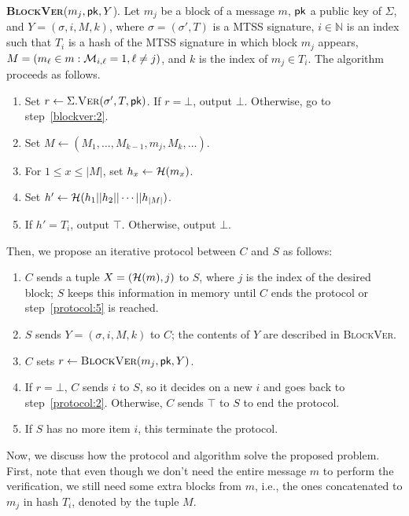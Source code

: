 \documentclass[12pt]{article}
\begin{document}
\noindent\textbf{\textsc{BlockVer}}($m_j, \mathsf{pk}, Y$). Let $m_j$ be a block of a message $m$, $\mathsf{pk}$ a public key of $\Sigma$, and $Y = (\sigma, i, M, k)$, where $\sigma = (\sigma', T)$ is a MTSS signature, $i \in \mathbb{N}$ is an index such that $T_i$ is a hash of the MTSS signature in which block $m_j$ appears, $M = (m_{\ell} \in m : \mathcal{M}_{i, \ell} = 1, \ell \neq j)$, and $k$ is the index of $m_{j} \in T_{i}$. The algorithm proceeds as follows.

\begin{enumerate}
  \item\label{blockver:1} Set $r \leftarrow \Sigma.\textsc{Ver}(\sigma', T, \mathsf{pk})$. If $r = \bot$, output $\bot$. Otherwise, go to step~\ref{blockver:2}.
  \item\label{blockver:2} Set $M \leftarrow (M_{1}, \dots, M_{k - 1}, m_{j}, M_{k}, \dots)$.
  \item\label{blockver:3} For $1 \leq x \leq |M|$, set $h_{x} \leftarrow \mathcal{H}(m_{x})$.
  \item\label{blockver:4} Set $h' \leftarrow \mathcal{H}(h_{1} || h_{2} || \cdots || h_{|M|})$.
  \item\label{blockver:5} If $h' = T_{i}$, output $\top$. Otherwise, output $\bot$.
\end{enumerate}

\noindent Then, we propose an iterative protocol between $C$ and $S$ as follows:
\begin{enumerate}
  \item\label{protocol:1} $C$ sends a tuple $X = (\mathcal{H}(m), j)$ to $S$, where $j$ is the index of the desired block; $S$ keeps this information in memory until $C$ ends the protocol or step~\ref{protocol:5} is reached.
  \item\label{protocol:2} $S$ sends $Y = (\sigma, i, M, k)$ to $C$; the contents of $Y$ are described in \textsc{BlockVer}.
  \item\label{protocol:3} $C$ sets $r \leftarrow \textsc{BlockVer}(m_{j}, \mathsf{pk}, Y)$.
  \item\label{protocol:4} If $r = \bot$, $C$ sends $i$ to $S$, so it decides on a new $i$ and goes back to step~\ref{protocol:2}. Otherwise, $C$ sends $\top$ to $S$ to end the protocol.
  \item\label{protocol:5} If $S$ has no more item $i$, this terminate the protocol.
\end{enumerate}

Now, we discuss how the protocol and algorithm solve the proposed problem. First, note that even though we don't need the entire message $m$ to perform the verification, we still need some extra blocks from $m$, i.e., the ones concatenated to $m_j$ in hash $T_i$, denoted by the tuple $M$.
\end{document}
